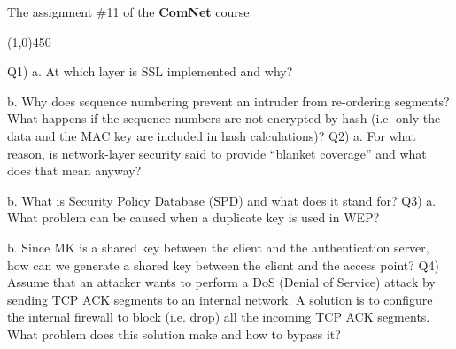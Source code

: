 \documentclass[10pt,letterpaper]{article}
\newcommand{\hl}{
\begin{center}
\line(1,0){450}
\end{center}}
\begin{document}
\Large
\begin{center}
The assignment \#11 of the \textbf{ComNet} course
\hl
\end{center}
Q1) a. At which layer is SSL implemented and why?

b. Why does sequence numbering prevent an intruder from re-ordering segments? What happens if the sequence numbers are not encrypted by hash (i.e. only the data and the MAC key are included in hash calculations)?
\newline\newline
Q2) a. For what reason, is network-layer security said to provide “blanket coverage” and what does that mean anyway?

b. What is Security Policy Database (SPD) and what does it stand for?
\newline\newline
Q3) a. What problem can be caused when a duplicate key is used in WEP?

b. Since MK is a shared key between the client and the authentication server, how can we generate a shared key between the client and the access point?
\newline\newline
Q4) Assume that an attacker wants to perform a DoS (Denial of Service) attack by sending TCP ACK segments to an internal network. A solution is to configure the internal firewall to block (i.e. drop) all the incoming TCP ACK segments. What problem does this solution make and how to bypass it?
\end{document}
